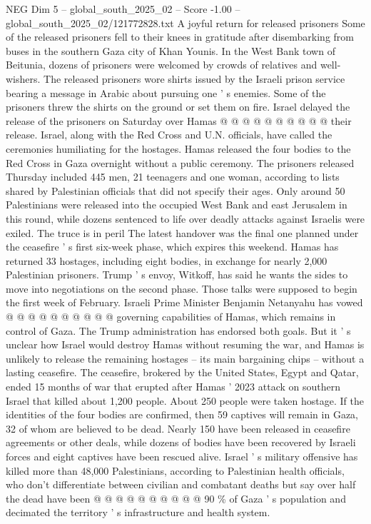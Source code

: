 \begin{textsample}{NEG Dim 5 – global\_south\_2025\_02 – Score -1.00 – global\_south\_2025\_02/121772828.txt}
A joyful return for released prisoners Some of the released prisoners fell to their knees in gratitude after disembarking from buses in the southern Gaza city of Khan Younis.
In the West Bank town of Beitunia, dozens of prisoners were welcomed by crowds of relatives and well-wishers.
The released prisoners wore shirts issued by the Israeli prison service bearing a message in Arabic about pursuing one ' s enemies.
Some of the prisoners threw the shirts on the ground or set them on fire.
Israel delayed the release of the prisoners on Saturday over Hamas @ @ @ @ @ @ @ @ @ @ their release.
Israel, along with the Red Cross and U.N. officials, have called the ceremonies humiliating for the hostages.
Hamas released the four bodies to the Red Cross in Gaza overnight without a public ceremony.
The prisoners released Thursday included 445 men, 21 teenagers and one woman, according to lists shared by Palestinian officials that did not specify their ages.
Only around 50 Palestinians were released into the occupied West Bank and east Jerusalem in this round, while dozens sentenced to life over deadly attacks against Israelis were exiled.
The truce is in peril The latest handover was the final one planned under the ceasefire ' s first six-week phase, which expires this weekend.
Hamas has returned 33 hostages, including eight bodies, in exchange for nearly 2,000 Palestinian prisoners.
Trump ' s envoy, Witkoff, has said he wants the sides to move into negotiations on the second phase.
Those talks were supposed to begin the first week of February.
Israeli Prime Minister Benjamin Netanyahu has vowed @ @ @ @ @ @ @ @ @ @ governing capabilities of Hamas, which remains in control of Gaza.
The Trump administration has endorsed both goals.
But it ' s unclear how Israel would destroy Hamas without resuming the war, and Hamas is unlikely to release the remaining hostages -- its main bargaining chips -- without a lasting ceasefire.
The ceasefire, brokered by the United States, Egypt and Qatar, ended 15 months of war that erupted after Hamas ' 2023 attack on southern Israel that killed about 1,200 people.
About 250 people were taken hostage.
If the identities of the four bodies are confirmed, then 59 captives will remain in Gaza, 32 of whom are believed to be dead.
Nearly 150 have been released in ceasefire agreements or other deals, while dozens of bodies have been recovered by Israeli forces and eight captives have been rescued alive.
Israel ' s military offensive has killed more than 48,000 Palestinians, according to Palestinian health officials, who don't differentiate between civilian and combatant deaths but say over half the dead have been @ @ @ @ @ @ @ @ @ @ 90 \% of Gaza ' s population and decimated the territory ' s infrastructure and health system.

\end{textsample}
